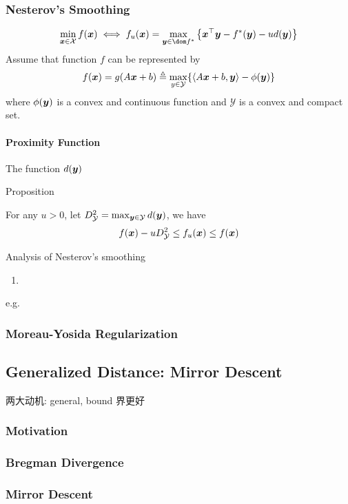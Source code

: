 \subsubsection{Nesterov's Smoothing}
\begin{align*}
    \min_{\bx\in\mathcal{X}}f(\bx)\iff f_u(\bx)=\max_{\by\in\dom f^*}\left\{ \bx^\top\by-f^*(\by)-ud(\by) \right\}
\end{align*}
Assume that function $f$ can be represented by
\begin{align*}
    f(\bm{x})=g(A\bm{x}+b) \triangleq \max_{y\in\mathcal{Y}}\{ \braket{A\bm{x}+b,\bm{y}}-\phi(\bm{y}) \}
\end{align*}
where $\phi(\bm{y})$ is a convex and continuous function and $\mathcal{Y}$ is a convex and compact set. 

\paragraph{Proximity Function}The function $d(\bm{y})$

Proposition

\begin{theorem}
    For any $u>0$, let $D_{\mathcal{Y}}^2=\max_{\bm{y}\in\mathcal{Y}}d(\bm{y})$, we have
    \begin{align*}
        f(\bm{x})-uD_{\mathcal{Y}}^2\le f_u(\bm{x})\le f(\bm{x})
    \end{align*}
\end{theorem}

Analysis of Nesterov's smoothing
\begin{enumerate}
    \item 
\end{enumerate}

e.g. 


\subsubsection{Moreau-Yosida Regularization}

\subsection{Generalized Distance: Mirror Descent}
两大动机: general, bound 界更好

\subsubsection{Motivation}
\subsubsection{Bregman Divergence}
\subsubsection{Mirror Descent}
